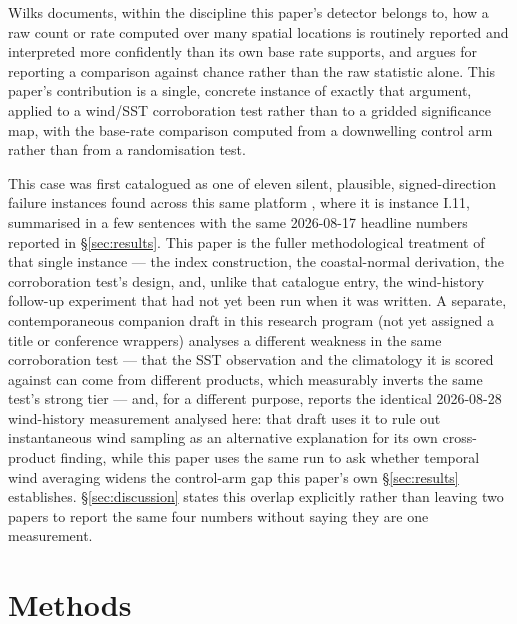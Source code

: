  Wilks
\citep{wilks2016} documents, within the discipline this paper's detector
belongs to, how a raw count or rate computed over many spatial locations is
routinely reported and interpreted more confidently than its own base rate
supports, and argues for reporting a comparison against chance rather than
the raw statistic alone. This paper's contribution is a single, concrete
instance of exactly that argument, applied to a wind/SST corroboration test
rather than to a gridded significance map, with the base-rate comparison
computed from a downwelling control arm rather than from a randomisation
test.

 This case was first
catalogued as one of eleven silent, plausible, signed-direction failure
instances found across this same platform \citep{silentfailures2026}, where
it is instance I.11, summarised in a few sentences with the same
2026-08-17 headline numbers reported in \S\ref{sec:results}. This paper is
the fuller methodological treatment of that single instance --- the index
construction, the coastal-normal derivation, the corroboration test's design,
and, unlike that catalogue entry, the wind-history follow-up experiment that
had not yet been run when it was written. A separate, contemporaneous
companion draft in this research program (not yet assigned a title or
conference wrappers) analyses a different weakness in the same corroboration
test --- that the SST observation and the climatology it is scored against
can come from different products, which measurably inverts the same test's
strong tier --- and, for a different purpose, reports the identical
2026-08-28 wind-history measurement analysed here: that draft uses it to
rule out instantaneous wind sampling as an alternative explanation for its
own cross-product finding, while this paper uses the same run to ask whether
temporal wind averaging widens the control-arm gap this paper's own
\S\ref{sec:results} establishes. \S\ref{sec:discussion} states this overlap
explicitly rather than leaving two papers to report the same four numbers
without saying they are one measurement.

\section{Methods}
\label{sec:methods}

